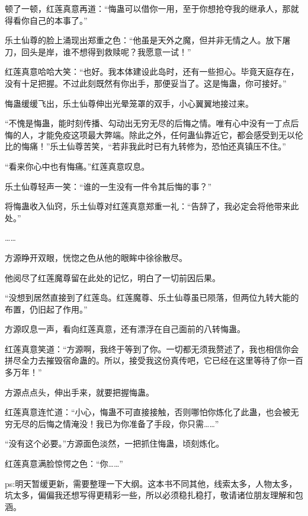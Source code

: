 \begin{this_body}
顿了一顿，红莲真意再道：“悔蛊可以借你一用，至于你想抢夺我的继承人，那就得看你自己的本事了。”

乐土仙尊的脸上涌现出郑重之色：“他虽是天外之魔，但并非无情之人。放下屠刀，回头是岸，谁不想得到救赎呢？我愿意一试！”

红莲真意哈哈大笑：“也好。我本体建设此岛时，还有一些担心。毕竟天庭存在，没有十足把握。不过此刻既然有你出手，那便妥当了。这是悔蛊，你可接好。”

悔蛊缓缓飞出，乐土仙尊伸出光晕笼罩的双手，小心翼翼地接过来。

“不愧是悔蛊，能时刻传播、勾动出无穷无尽的后悔之情。唯有心中没有一丁点后悔的人，才能免疫这项最大弊端。除此之外，任何蛊仙靠近它，都会感受到无以伦比的悔痛！”乐土仙尊苦笑，“若非我此时已有九转修为，恐怕还真镇压不住。”

“看来你心中也有悔痛。”红莲真意叹息。

乐土仙尊轻声一笑：“谁的一生没有一件令其后悔的事？”

将悔蛊收入仙窍，乐土仙尊对红莲真意郑重一礼：“告辞了，我必定会将他带来此处。”

……

方源睁开双眼，恍惚之色从他的眼眸中徐徐散尽。

他阅尽了红莲魔尊留在此处的记忆，明白了一切前因后果。

“没想到居然直接到了红莲岛。红莲魔尊、乐土仙尊虽已陨落，但两位九转大能的布置，仍旧起了作用。”

方源叹息一声，看向红莲真意，还有漂浮在自己面前的八转悔蛊。

红莲真意笑道：“方源啊，我终于等到了你。一切都无须我赘述了，我也相信你会拼尽全力去摧毁宿命蛊的。所以，接受我这份真传吧，它已经在这里等待了你一百多万年！”

方源点点头，伸出手来，就要把握悔蛊。

红莲真意连忙道：“小心，悔蛊不可直接接触，否则哪怕你炼化了此蛊，也会被无穷无尽的后悔之情淹没！我已为你准备了手段，你只需……”

“没有这个必要。”方源面色淡然，一把抓住悔蛊，顷刻炼化。

红莲真意满脸惊愕之色：“你……”

ps:明天暂缓更新，需要整理一下大纲。这本书不同其他，线索太多，人物太多，坑太多，偏偏我还想写得更精彩一些，所以必须稳扎稳打，敬请诸位朋友理解和包涵。

\end{this_body}

